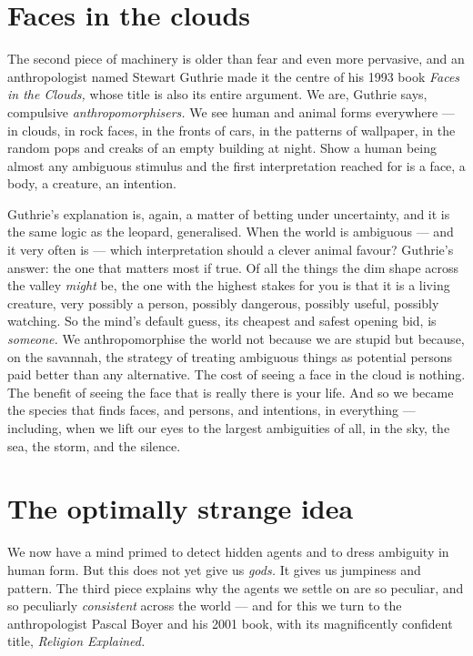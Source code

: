 \section*{Faces in the clouds}

The second piece of machinery is older than fear and even more pervasive, and an anthropologist named Stewart Guthrie made it the centre of his 1993 book \emph{Faces in the Clouds,} whose title is also its entire argument. We are, Guthrie says, compulsive \emph{anthropomorphisers.} We see human and animal forms everywhere — in clouds, in rock faces, in the fronts of cars, in the patterns of wallpaper, in the random pops and creaks of an empty building at night. Show a human being almost any ambiguous stimulus and the first interpretation reached for is a face, a body, a creature, an intention.

Guthrie's explanation is, again, a matter of betting under uncertainty, and it is the same logic as the leopard, generalised. When the world is ambiguous — and it very often is — which interpretation should a clever animal favour? Guthrie's answer: the one that matters most if true. Of all the things the dim shape across the valley \emph{might} be, the one with the highest stakes for you is that it is a living creature, very possibly a person, possibly dangerous, possibly useful, possibly watching. So the mind's default guess, its cheapest and safest opening bid, is \emph{someone.} We anthropomorphise the world not because we are stupid but because, on the savannah, the strategy of treating ambiguous things as potential persons paid better than any alternative. The cost of seeing a face in the cloud is nothing. The benefit of seeing the face that is really there is your life. And so we became the species that finds faces, and persons, and intentions, in everything — including, when we lift our eyes to the largest ambiguities of all, in the sky, the sea, the storm, and the silence.

\section*{The optimally strange idea}

We now have a mind primed to detect hidden agents and to dress ambiguity in human form. But this does not yet give us \emph{gods.} It gives us jumpiness and pattern. The third piece explains why the agents we settle on are so peculiar, and so peculiarly \emph{consistent} across the world — and for this we turn to the anthropologist Pascal Boyer and his 2001 book, with its magnificently confident title, \emph{Religion Explained.}

